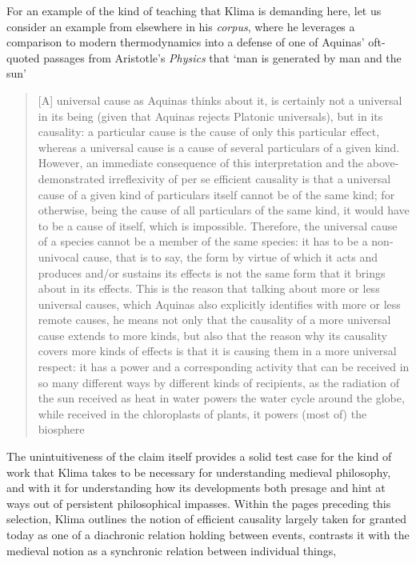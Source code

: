 \documentclass[]{article}
\begin{document}
For an example of the kind of teaching that Klima is demanding here, 
let us consider an example from elsewhere in his \emph{corpus}, 
where he leverages a comparison to modern thermodynamics 
into a defense of one of Aquinas' oft-quoted passages from Aristotle's \emph{Physics} 
that `man is generated by man and the sun'
\begin{quote}
	[A] universal
	cause as Aquinas thinks about it, is certainly not a universal in its being
	(given that Aquinas rejects Platonic universals), but in its causality: a
	particular cause is the cause of only this particular effect, whereas a
	universal cause is a cause of several particulars of a given kind. However,
	an immediate consequence of this interpretation and the above-demonstrated irreflexivity of per se efficient causality is that a universal
	cause of a given kind of particulars itself cannot be of the same kind; for
	otherwise, being the cause of all particulars of the same kind, it would
	have to be a cause of itself, which is impossible. Therefore, the universal
	cause of a species cannot be a member of the same species: it has to be a
	non-univocal cause, that is to say, the form by virtue of which it acts and
	produces and/or sustains its effects is not the same form that it brings
	about in its effects. This is the reason that talking about more or less
	universal causes, which Aquinas also explicitly identifies with more or
	less remote causes, he means not only that the causality of a more
	universal cause extends to more kinds, but also that the reason why its
	causality covers more kinds of effects is that it is causing them in a more
	universal respect: it has a power and a corresponding activity that can be
	received in so many different ways by different kinds of recipients, as the
	radiation of the sun received as heat in water powers the water cycle
	around the globe, while received in the chloroplasts of plants, it powers
	(most of) the biosphere \autocite[41]{Klima2013}
\end{quote}
The unintuitiveness of the claim itself provides a solid test case for the kind of work that Klima takes to be necessary for understanding medieval philosophy, 
and with it for understanding how its developments both presage and hint at ways out of persistent philosophical impasses. 
Within the pages preceding this selection, 
Klima outlines the notion of efficient causality largely taken for granted today as one of a diachronic relation holding between events, 
contrasts it with the medieval notion as a synchronic relation between individual things, 
\end{document}
